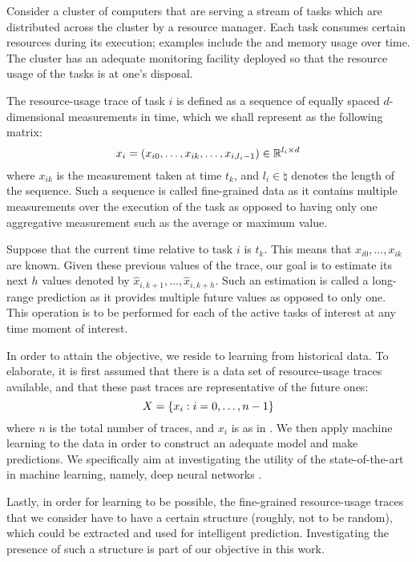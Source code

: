 Consider a cluster of computers that are serving a stream of tasks which are
distributed across the cluster by a resource manager. Each task consumes certain
resources during its execution; examples include the  and memory usage
over time. The cluster has an adequate monitoring facility deployed so that the
resource usage of the tasks is at one's disposal.

The resource-usage trace of task $i$ is defined as a sequence of equally spaced
$d$-dimensional measurements in time, which we shall represent as the following
matrix:
\begin{equation} \elab{trace}
  x_i = \left(x_{i0}, \dots, x_{ik}, \dots, x_{i,l_i - 1}\right) \in \real^{l_i \times d}
\end{equation}
where $x_{ik}$ is the measurement taken at time $t_k$, and $l_i \in \natural$
denotes the length of the sequence. Such a sequence is called fine-grained data
as it contains multiple measurements over the execution of the task as opposed
to having only one aggregative measurement such as the average or maximum value.

Suppose that the current time relative to task $i$ is $t_k$. This means that
$x_{i0}, \dots, x_{ik}$ are known. Given these previous values of the trace, our
goal is to estimate its next $h$ values denoted by $\hat{x}_{i,k + 1}, \dots,
\hat{x}_{i,k + h}$. Such an estimation is called a long-range prediction as it
provides multiple future values as opposed to only one. This operation is to be
performed for each of the active tasks of interest at any time moment of
interest.

In order to attain the objective, we reside to learning from historical data. To
elaborate, it is first assumed that there is a data set of resource-usage traces
available, and that these past traces are representative of the future ones:
\begin{equation} \elab{traces}
  X = \{ x_i: i = 0, \dots, n - 1 \}
\end{equation}
where $n$ is the total number of traces, and $x_i$ is as in . We
then apply machine learning \cite{hastie2009} to the data in order to construct
an adequate model and make predictions. We specifically aim at investigating the
utility of the state-of-the-art in machine learning, namely, deep neural
networks \cite{goodfellow2016}.

Lastly, in order for learning to be possible, the fine-grained resource-usage
traces that we consider have to have a certain structure (roughly, not to be
random), which could be extracted and used for intelligent prediction.
Investigating the presence of such a structure is part of our objective in this
work.
